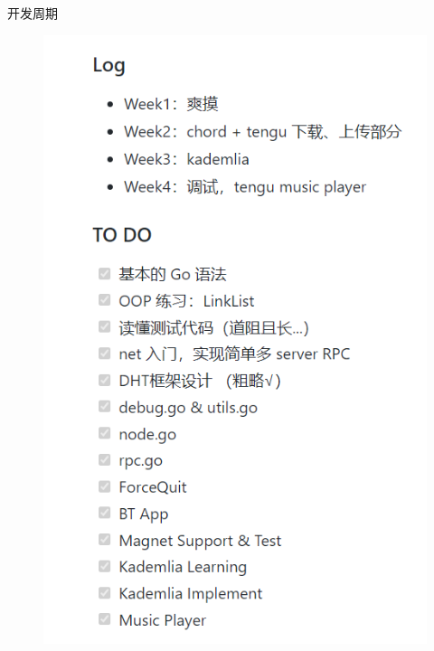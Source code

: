 \documentclass[10pt]{beamer}
\begin{document}
\begin{frame}{开发周期}

\begin{figure}
\centering
\includegraphics[scale=0.5]{figure/log.png}
\end{figure}

\end{frame}
\end{document}
